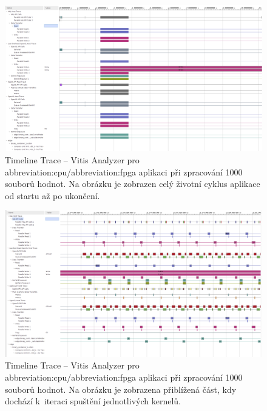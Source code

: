 \documentclass[a4paper, twoside, 11pt]{article}
\begin{document}
	\begin{figure}[htbp!]
		\centering
		\includegraphics[width=1\textwidth]{src/png/vitis-analyzer/rt/cpu-fpga-model-1k-values-0.000001-step/writing-data-output/rt-timeline-trace-zoom-out.png}
		\caption{Timeline Trace – Vitis Analyzer pro \gls{abbreviation:cpu}/\gls{abbreviation:fpga} aplikaci při zpracování 1000 souborů hodnot. Na obrázku je zobrazen celý životní cyklus aplikace od startu až po ukončení.}
		\label{fig:rt-timeline-trace-zoom-out}
	\end{figure}

	\begin{figure}[htbp!]
		\centering
		\includegraphics[width=1\textwidth]{src/png/vitis-analyzer/rt/cpu-fpga-model-1k-values-0.000001-step/writing-data-output/rt-timeline-trace-execution-start-zoom-in.png}
		\caption{Timeline Trace – Vitis Analyzer pro \gls{abbreviation:cpu}/\gls{abbreviation:fpga} aplikaci při zpracování 1000 souborů hodnot. Na obrázku je zobrazena přiblížená část, kdy dochází k~iteraci spuštění jednotlivých kernelů.}
		\label{fig:rt-timeline-trace-execution-start-zoom-in}
	\end{figure}
\end{document}
